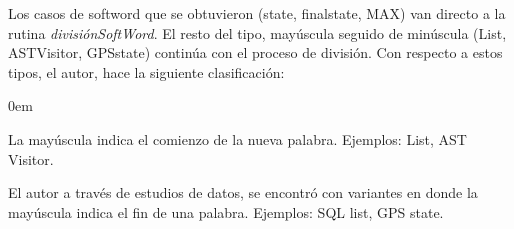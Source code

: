 Los casos de softword que se obtuvieron (\textsf{state}, \textsf{finalstate}, \textsf{MAX}) van directo a la rutina \mbox{\textit{divisiónSoftWord}}.
El resto del tipo, mayúscula seguido de minúscula (\textsf{List, ASTVisitor, GPSstate}) continúa con el proceso de división. Con respecto a estos tipos, el autor, hace la siguiente clasificación:

\begin{description}
\itemsep0em%
\item[Camel-case sencillo:] La mayúscula indica el comienzo de la nueva palabra. Ejemplos: \textsf{List}, \textsf{AST Visitor}. 
\item[Variante Camel-case:] El autor a través de estudios de datos, se encontró con variantes en donde la mayúscula indica el fin de una palabra. Ejemplos: \textsf{SQL list}, \textsf{GPS state}.
\end{description}


